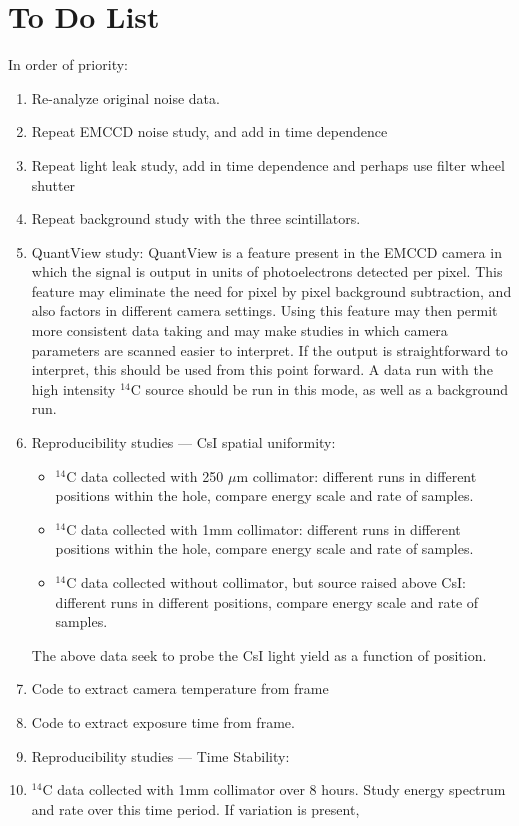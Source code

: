 \documentclass[11pt]{article}
\newcommand{\nuc}[2]{\ensuremath{^{#1}}#2}
\begin{document}
\section{To Do List}
In order of priority:
\begin{enumerate}
\item Re-analyze original noise data.
\item Repeat EMCCD noise study, and add in time dependence
\item Repeat light leak study, add in time dependence and perhaps use filter wheel shutter
\item Repeat background study with the three scintillators.
\item QuantView study: QuantView is a feature present in the EMCCD camera in which the signal is output in units of photoelectrons detected per pixel. This feature may eliminate the need for pixel by pixel background subtraction, and also factors in different camera settings. Using this feature may then permit more consistent data taking and may make studies in which camera parameters are scanned easier to interpret.  If the output is straightforward to interpret, this should be used from this point forward. A data run with the high intensity \nuc{14}{C} source should be run in this mode, as well as a background run.
\item Reproducibility studies --- CsI spatial uniformity:
	\begin{itemize}
		\item \nuc{14}{C} data collected with 250 $\mu$m collimator: different runs in different positions within the hole, compare energy scale and rate of samples.
		\item \nuc{14}{C} data collected with 1mm	 collimator: different runs in different positions within the hole, compare energy scale and rate of samples.
		\item \nuc{14}{C} data collected without collimator, but source raised above CsI: different runs in different positions, compare energy scale and rate of samples. 
	\end{itemize}
The above data seek to probe the CsI light yield as a function of position.	 
\item Code to extract camera temperature from frame
\item Code to extract exposure time from frame.
\item Reproducibility studies --- Time Stability: \item \nuc{14}{C} data collected with 1mm	 collimator over 8 hours. Study energy spectrum and rate over this time period. If variation is present,

\end{enumerate}
\end{document}
